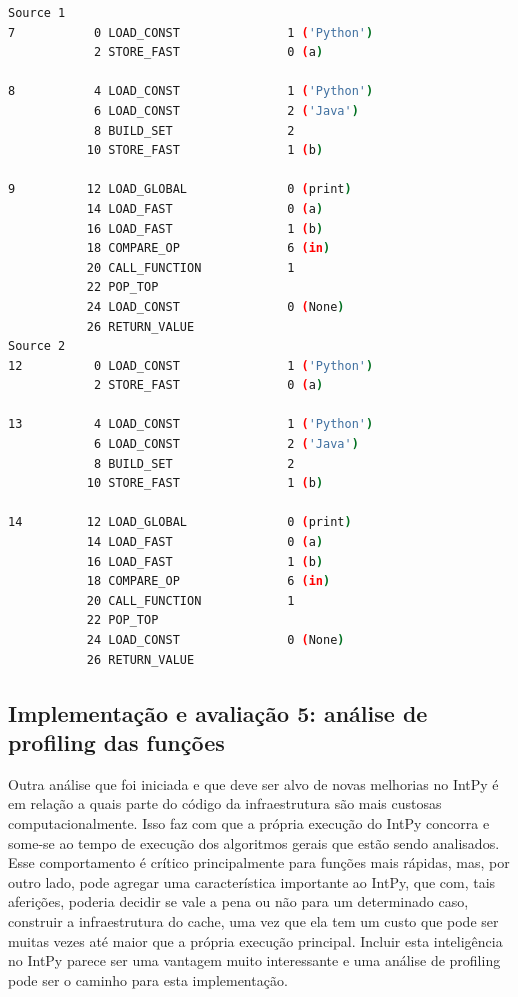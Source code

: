 \documentclass[sigconf]{acmart}
\begin{document}
\renewcommand{\lstlistingname}{Trecho de código}
\begin{lstlisting}[language=bash, caption=Saída de comparação a nível de bytecode]
Source 1
7           0 LOAD_CONST               1 ('Python')
            2 STORE_FAST               0 (a)

8           4 LOAD_CONST               1 ('Python')
            6 LOAD_CONST               2 ('Java')
            8 BUILD_SET                2
           10 STORE_FAST               1 (b)

9          12 LOAD_GLOBAL              0 (print)
           14 LOAD_FAST                0 (a)
           16 LOAD_FAST                1 (b)
           18 COMPARE_OP               6 (in)
           20 CALL_FUNCTION            1
           22 POP_TOP
           24 LOAD_CONST               0 (None)
           26 RETURN_VALUE
Source 2
12          0 LOAD_CONST               1 ('Python')
            2 STORE_FAST               0 (a)

13          4 LOAD_CONST               1 ('Python')
            6 LOAD_CONST               2 ('Java')
            8 BUILD_SET                2
           10 STORE_FAST               1 (b)

14         12 LOAD_GLOBAL              0 (print)
           14 LOAD_FAST                0 (a)
           16 LOAD_FAST                1 (b)
           18 COMPARE_OP               6 (in)
           20 CALL_FUNCTION            1
           22 POP_TOP
           24 LOAD_CONST               0 (None)
           26 RETURN_VALUE
\end{lstlisting}

\subsection{Implementação e avaliação 5: análise de profiling das funções}
Outra análise que foi iniciada e que deve ser alvo de novas melhorias no IntPy é em relação a quais parte do código da infraestrutura são mais custosas computacionalmente. Isso faz com que a própria execução do IntPy concorra e some-se ao tempo de execução dos algoritmos gerais que estão sendo analisados. Esse comportamento é crítico principalmente para funções mais rápidas, mas, por outro lado, pode agregar uma característica importante ao IntPy, que com, tais aferições, poderia decidir se vale a pena ou não para um determinado caso, construir a infraestrutura do cache, uma vez que ela tem um custo que pode ser muitas vezes até maior que a própria execução principal. Incluir esta inteligência no IntPy parece ser uma vantagem muito interessante e uma análise de profiling pode ser o caminho para esta implementação.
\end{document}
